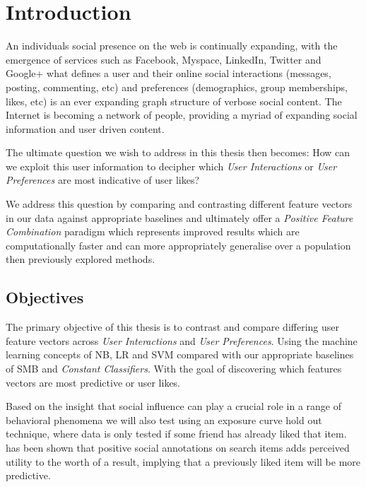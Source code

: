 
\chapter{Introduction}
\label{cha:intro}

An individuals social presence on the web is continually expanding, with the emergence of services such as Facebook, Myspace, LinkedIn, Twitter 
and Google+ what defines a user and their online social interactions (messages, posting, commenting, etc) and preferences 
(demographics, group memberships, likes, etc) is an ever expanding graph structure of verbose social content. The Internet is becoming a network 
of people, providing a myriad of expanding social information and user driven content.

The ultimate question we wish to address in this thesis then becomes: 
How can we exploit this user information to decipher which \emph{User Interactions} or \emph{User Preferences} are most 
indicative of user likes? 

We address this question by comparing and contrasting different feature vectors in our data against appropriate baselines and 
ultimately offer a \emph{Positive Feature Combination} paradigm which represents improved results which are computationally faster and can more 
appropriately generalise over a population then previously explored methods.

\section{Objectives}
\label{sec:objectives}

The primary objective of this thesis is to contrast and compare differing user feature vectors across \emph{User Interactions} and 
\emph{User Preferences}. Using the machine learning concepts of NB, LR and SVM compared with our appropriate baselines of 
SMB and \emph{Constant Classifiers}. With the goal of discovering which features vectors are most predictive or user likes.

Based on the insight that social inﬂuence can play a crucial role in a range of behavioral phenomena \cite{grano,watts} we will 
also test using an exposure curve \cite{Romero2011hashtag} hold out technique, where data is only tested if some friend has 
already liked that item. ~\cite{pantel} has been shown that positive social annotations on search items adds perceived utility
to the worth of a result, implying that a previously liked item will be more predictive.

